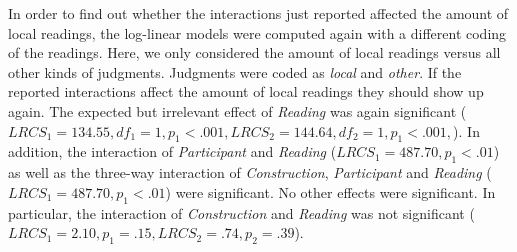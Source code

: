 \documentclass[fleqn,reqno,10pt,draft]{article}
\begin{document}
In order to find out whether the interactions just reported affected
the amount of local readings, the log-linear models were computed
again with a different coding of the readings. Here, we only
considered the amount of local readings versus all other kinds of
judgments. Judgments were coded as {\it local} and {\it other}. If the
reported interactions affect the amount of local readings they should
show up again. The expected but irrelevant effect of {\it Reading} was
again significant ($LRCS_1=134.55, df_1 = 1, p_1<.001, LRCS_2=144.64,
df_2 = 1, p_1<.001,$). In addition, the interaction of {\it
  Participant} and {\it Reading} ($LRCS_1=487.70, p_1<.01$) as well as
the three-way interaction of {\it Construction}, {\it Participant} and
{\it Reading} ($LRCS_1=487.70, p_1<.01$) were significant. No other
effects were significant. In particular, the interaction of {\it
  Construction} and {\it Reading} was not significant ($LRCS_1=2.10,
p_1=.15,LRCS_2=.74, p_2=.39$).
\end{document}
